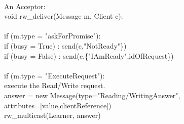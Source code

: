 \documentclass[paper=a4, fontsize=11pt]{scrartcl} %
\numberwithin{equation}{section} %
\numberwithin{figure}{section} %
\numberwithin{table}{section} %
\begin{document}
~\\
An Acceptor:\\
{\selectfont 
void rw\_deliver(Message m, Client c): \\
~\\
\quad \quad if (m.type = "askForPromise"):\\
\quad \quad \quad \quad if (busy = True) : send(c,"NotReady"\})\\
\quad \quad \quad \quad if (busy = False) : send(c,\{"IAmReady",idOfRequest\})\\
~\\
\quad \quad if (m.type = "ExecuteRequest"):\\
\quad \quad \quad \quad execute the Read/Write request.\\
\quad \quad \quad \quad answer = new Message(type="Reading/WritingAnswer", \\
\quad \quad \quad \quad \quad \quad \quad \quad \quad \quad  \quad \quad attributes=[value,clientReference])\\
\quad \quad \quad \quad rw\_multicast(Learner, answer)\\
~\\
}
\end{document}
